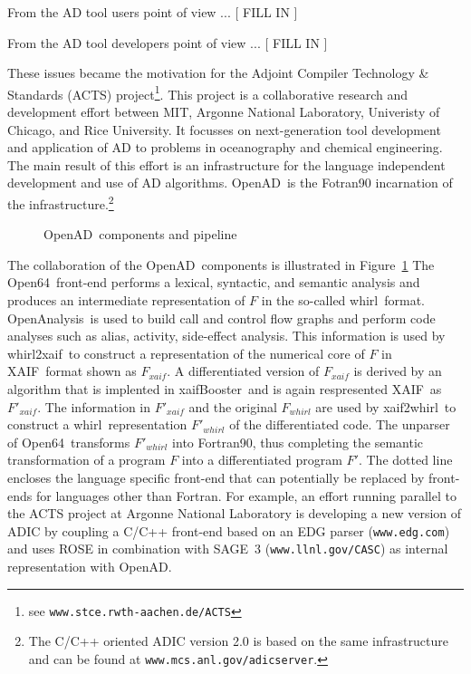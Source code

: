 \documentclass[acmtocl,acmnow]{acmtrans2m}
\newcommand{\OpenAD}{OpenAD}
\newcommand{\OpenAnalysis}{OpenAnalysis}
\newcommand{\OpenSixtyFour}{Open64}
\newcommand{\xaif}{XAIF}
\newcommand{\xaifBooster}{xaifBooster}
\newcommand{\whirl}{whirl}
\newcommand{\whirlToxaif}{whirl2xaif}
\newcommand{\xaifTowhirl}{xaif2whirl}
\newcommand{\reffig}[1]{Figure~\ref{#1}}
\begin{document}
From  the AD tool  users point of view ... 
{\color{Red} [ FILL IN ] } 

From the AD tool developers point of view ...
{\color{Red} [ FILL IN ] } 

These issues became the motivation for the 
Adjoint Compiler Technology \& Standards (ACTS) project\footnote{ 
see {\tt www.stce.rwth-aachen.de/ACTS}
}. 
This project is a collaborative
research and development effort between MIT, Argonne National Laboratory, 
Univeristy of Chicago, and Rice University. 
It focusses on  next-generation tool development and 
application of AD to problems in oceanography and chemical engineering.
The main result of this effort is an infrastructure for the language independent 
development and use of AD algorithms. 
\OpenAD\ is the Fotran90 incarnation of the infrastructure.\footnote{
The C/C++ oriented ADIC version 2.0 is based on the same infrastructure and can be found
at {\tt www.mcs.anl.gov/adicserver}.
}
\begin{figure}
\caption{\OpenAD\ components and pipeline} \label{fig:overview}
\end{figure}
The collaboration  of the \OpenAD\  components is illustrated in 
\reffig{fig:overview}
The \OpenSixtyFour\ front-end performs a lexical, 
syntactic, and semantic analysis and produces an 
intermediate representation of $F$ in the so-called \whirl\ format.
\OpenAnalysis\ is used to build call and control flow graphs and  perform 
code analyses such as alias, activity, side-effect analysis.
This information is used by 
\whirlToxaif\ to construct a representation of the numerical core of $F$ in
\xaif\ format shown as $F_{xaif}$.  
A differentiated version of $F_{xaif}$ is derived by an 
algorithm that is implented in \xaifBooster\ and is again respresented 
\xaif\ as $F'_{xaif}$.
The information in $F'_{xaif}$ and the original $F_{\whirl}$ are used by 
\xaifTowhirl\ to construct a 
\whirl\ representation $F'_{\whirl}$ of the differentiated code. 
The unparser of 
\OpenSixtyFour\ transforms $F'_{\whirl}$ into Fortran90, thus completing
the semantic transformation of a program $F$ into
a differentiated program $F'$.
The dotted line encloses the language specific front-end that can potentially
be replaced by front-ends for languages other than Fortran. 
For example, an 
effort running parallel to the ACTS project at Argonne National Laboratory is 
developing a new version of ADIC \cite{HoNo01} by coupling a C/C++ 
front-end 
based on an EDG parser ({\tt www.edg.com}) and uses ROSE in combination with SAGE~3 ({\tt www.llnl.gov/CASC}) as internal representation
with \OpenAD.
\end{document}
